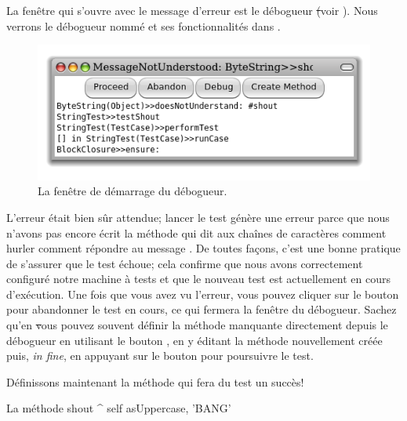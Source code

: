 \documentclass[a4paper,10pt,twoside]{book}
\begin{document}
La fenêtre qui s'ouvre avec le message d'erreur est le débogueur \st (voir ).
Nous verrons le débogueur nommé  et ses
fonctionnalités dans .

\begin{figure}[hbt]

	\centerline {\includegraphics[width=\textwidth]{Predebugger}}
\caption{La fenêtre de démarrage du débogueur.}
\end{figure}

L'erreur était bien sûr attendue; lancer le test génère une
erreur parce que nous n'avons pas encore écrit la méthode qui dit
aux chaînes de caractères comment hurler 
\cad comment répondre au message .
De toutes façons, c'est une bonne pratique de s'assurer que le test
échoue; cela confirme que nous avons correctement
configuré notre machine à tests %
et que le nouveau test est actuellement en cours d'exécution.
Une fois que vous avez vu l'erreur, vous pouvez cliquer sur le bouton
 pour abandonner le test en cours, ce qui fermera la
fenêtre du débogueur.
Sachez qu'en \st vous pouvez souvent définir la méthode manquante
directement depuis le débogueur 
en utilisant le bouton , en y éditant la méthode
nouvellement créée puis, \emph{in fine}, en appuyant sur le bouton
 pour poursuivre le test.

Définissons maintenant la méthode qui fera du test un succès!

\begin{method}[shout]{La méthode }
shout
	^ self asUppercase, 'BANG'
\end{method}
\end{document}
